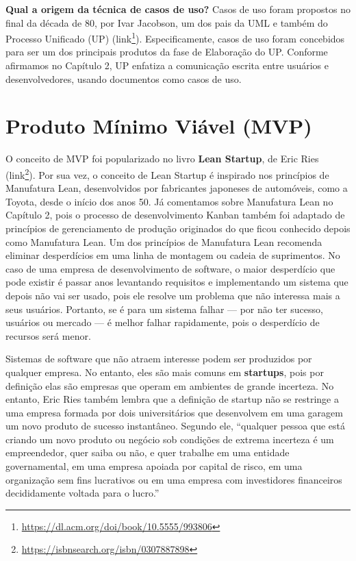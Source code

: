 \documentclass[
  11pt,
  twoside]{book}
\DeclareRobustCommand{\href}[2]{#2\footnote{\url{#1}}}
\begin{document}
\textbf{Qual a origem da técnica de casos de uso?} Casos de uso foram
propostos no final da década de 80, por Ivar Jacobson, um dos pais da
UML e também do Processo Unificado (UP)
(\href{https://dl.acm.org/doi/book/10.5555/993806}{link}).
Especificamente, casos de uso foram concebidos para ser um dos
principais produtos da fase de Elaboração do UP. Conforme afirmamos no
Capítulo 2, UP enfatiza a comunicação escrita entre usuários e
desenvolvedores, usando documentos como casos de uso.

\hypertarget{produto-muxednimo-viuxe1vel-mvp}{%
\section{Produto Mínimo Viável
(MVP)}\label{produto-muxednimo-viuxe1vel-mvp}}

  
  
 O conceito de MVP foi popularizado no livro
\textbf{Lean Startup}, de Eric Ries
(\href{https://isbnsearch.org/isbn/0307887898}{link}). Por sua vez, o
conceito de Lean Startup é inspirado nos princípios de Manufatura Lean,
desenvolvidos por fabricantes japoneses de automóveis, como a Toyota,
desde o início dos anos 50. Já comentamos sobre Manufatura Lean no
Capítulo 2, pois o processo de desenvolvimento Kanban também foi
adaptado de princípios de gerenciamento de produção originados do que
ficou conhecido depois como Manufatura Lean. Um dos princípios de
Manufatura Lean recomenda eliminar desperdícios em uma linha de montagem
ou cadeia de suprimentos. No caso de uma empresa de desenvolvimento de
software, o maior desperdício que pode existir é passar anos levantando
requisitos e implementando um sistema que depois não vai ser usado, pois
ele resolve um problema que não interessa mais a seus usuários.
Portanto, se é para um sistema falhar --- por não ter sucesso, usuários
ou mercado --- é melhor falhar rapidamente, pois o desperdício de
recursos será menor.

Sistemas de software que não atraem interesse podem ser produzidos por
qualquer empresa. No entanto, eles são mais comuns em \textbf{startups},
pois por definição elas são empresas que operam em ambientes de grande
incerteza. No entanto, Eric Ries também lembra que a definição de
startup não se restringe a uma empresa formada por dois universitários
que desenvolvem em uma garagem um novo produto de sucesso instantâneo.
Segundo ele, ``qualquer pessoa que está criando um novo produto ou
negócio sob condições de extrema incerteza é um empreendedor, quer saiba
ou não, e quer trabalhe em uma entidade governamental, em uma empresa
apoiada por capital de risco, em uma organização sem fins lucrativos ou
em uma empresa com investidores financeiros decididamente voltada para o
lucro.''
\end{document}
